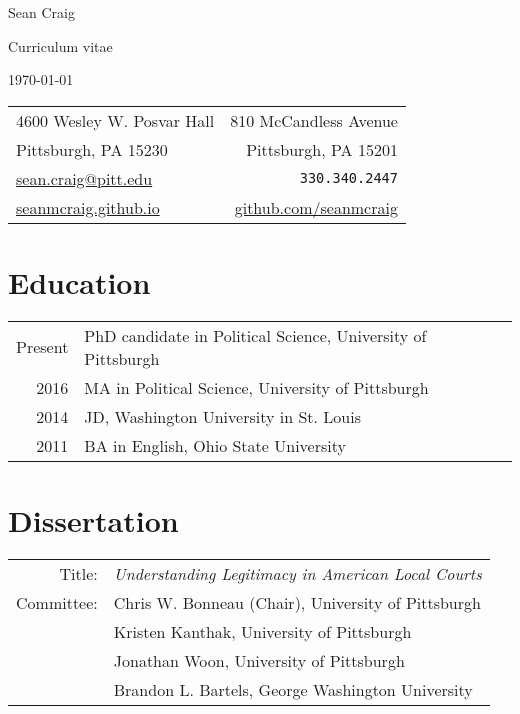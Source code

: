 \documentclass[12pt,letterpaper]{article}
\begin{document}
\begin{center}
  {\Large  Sean Craig} \par
  Curriculum vitae \par
  \today \par
\end{center}

\begin{tabularx}{\textwidth}{@{}XR@{}}
  4600 Wesley W. Posvar Hall & 810 McCandless Avenue \\
  Pittsburgh, PA 15230 & Pittsburgh, PA 15201 \\
  \href{mailto:sean.craig@pitt.edu}{sean.craig@pitt.edu} & {\tt 330.340.2447} \\
  \href{https://seanmcraig.github.io}{seanmcraig.github.io} & \href{https://github.com/seanmcraig}{github.com/seanmcraig}\\
\end{tabularx} \par\bigskip\bigskip

\section*{\sf Education}
\begin{tabularx}{\textwidth}{@{}DX@{}}
  Present & PhD candidate in Political Science, University of Pittsburgh \\
  2016 & MA in Political Science, University of Pittsburgh \\
  2014 & JD, Washington University in St. Louis \\
  2011 & BA in English, Ohio State University \\
\end{tabularx} \par\bigskip\bigskip

\section*{\sf Dissertation}
\begin{tabularx}{\textwidth}{@{}DX@{}}
  Title: & {\em Understanding Legitimacy in American Local Courts} \\
  Committee: & Chris W. Bonneau (Chair), University of Pittsburgh \\
  & Kristen Kanthak, University of Pittsburgh \\
  & Jonathan Woon, University of Pittsburgh \\
  & Brandon L. Bartels, George Washington University
\end{tabularx} \par\bigskip
\end{document}

